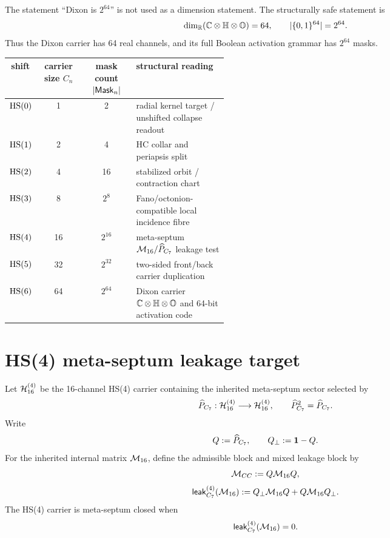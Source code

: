 \begin{remark}
The statement ``Dixon is \(2^{64}\)'' is not used as a dimension statement. The structurally safe statement is
\[
\dim_{\mathbb R}(\mathbb C\otimes\mathbb H\otimes\mathbb O)=64,
\qquad
|\{0,1\}^{64}|=2^{64}.
\]
Thus the Dixon carrier has 64 real channels, and its full Boolean activation grammar has \(2^{64}\) masks.
\end{remark}

\begin{center}
\small
\begin{tabular}{c|c|c|P{0.42\linewidth}}
\toprule
shift & carrier size \(C_n\) & mask count \(|\mathsf{Mask}_n|\) & structural reading\\
\midrule
\(\mathrm{HS}(0)\) & 1 & 2 & radial kernel target / unshifted collapse readout\\
\(\mathrm{HS}(1)\) & 2 & 4 & HC collar and periapsis split\\
\(\mathrm{HS}(2)\) & 4 & 16 & stabilized orbit / contraction chart\\
\(\mathrm{HS}(3)\) & 8 & \(2^8\) & Fano/octonion-compatible local incidence fibre\\
\(\mathrm{HS}(4)\) & 16 & \(2^{16}\) & meta-septum \(\mathcal M_{16}/\widehat P_{C_7}\) leakage test\\
\(\mathrm{HS}(5)\) & 32 & \(2^{32}\) & two-sided front/back carrier duplication\\
\(\mathrm{HS}(6)\) & 64 & \(2^{64}\) & Dixon carrier \(\mathbb C\otimes\mathbb H\otimes\mathbb O\) and 64-bit activation code\\
\bottomrule
\end{tabular}
\end{center}

\section{HS(4) meta-septum leakage target}

\begin{definition}
Let \(\mathcal H^{(4)}_{16}\) be the 16-channel HS(4) carrier containing the inherited meta-septum sector selected by
\[
\widehat P_{C_7}:\mathcal H^{(4)}_{16}\longrightarrow \mathcal H^{(4)}_{16},
\qquad
\widehat P_{C_7}^2=\widehat P_{C_7}.
\]
Write
\[
Q:=\widehat P_{C_7},
\qquad
Q_{\perp}:=\mathbf 1-Q.
\]
For the inherited internal matrix \(\mathcal M_{16}\), define the admissible block and mixed leakage block by
\[
\mathcal M_{CC}:=Q\mathcal M_{16} Q,
\]
\[
\mathsf{leak}_{C_7}^{(4)}(\mathcal M_{16})
:=
Q_{\perp}\mathcal M_{16} Q+Q\mathcal M_{16}Q_{\perp}.
\]
The HS(4) carrier is meta-septum closed when
\[
\mathsf{leak}_{C_7}^{(4)}(\mathcal M_{16})=0.
\]
\end{definition}

